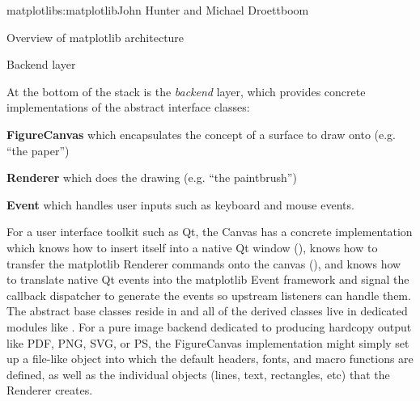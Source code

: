 \begin{aosachapter}{matplotlib}{s:matplotlib}{John Hunter and Michael Droettboom}
\begin{aosasect1}{Overview of matplotlib architecture}

\begin{aosasect2}{Backend layer}

At the bottom of the stack is the \emph{backend} layer, which provides
concrete implementations of the abstract interface classes:
\begin{aosaitemize}
\item \textbf{FigureCanvas} which encapsulates the concept of
  a surface to draw onto (e.g. ``the paper'')

\item \textbf{Renderer} which does the drawing (e.g. ``the paintbrush'')

\item \textbf{Event} which handles user inputs such as keyboard and
  mouse events.
\end{aosaitemize}
For a user interface toolkit such as Qt, the Canvas has a concrete
implementation which knows how to insert itself into a native Qt
window (), knows how to transfer the
matplotlib Renderer commands onto the canvas (),
and knows how to translate native Qt events into the matplotlib Event
framework and signal the callback dispatcher to generate the events so
upstream listeners can handle them.  The abstract base classes reside
in  and all of the derived classes
live in dedicated modules like
.  For a pure image backend
dedicated to producing hardcopy output like PDF, PNG, SVG, or PS, the
FigureCanvas implementation might simply set up a file-like object
into which the default headers, fonts, and macro functions are
defined, as well as the individual objects (lines, text, rectangles,
etc) that the Renderer creates.


\end{aosasect2}
\end{aosasect1}
\end{aosachapter}
